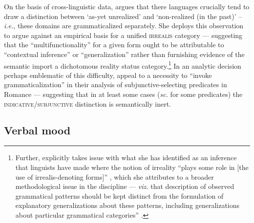 On the basis of cross-linguistic data, \citet[138\textit{ff}]{Cristofaro2012} argues that there languages crucially tend to draw a distinction between `as-yet unrealized' and `non-realized (in the past)' -- \textit{i.e.}, these domains are grammaticalized separately. She deploys this observation to argue against an empirical basis for a unified \textsc{irrealis} category --- suggesting that the ``multifunctionality'' for a given form ought to be attributable to ``contextual inference'' or ``generalization'' rather than furnishing evidence of the semantic import a dichotomous reality status category.\footnote{Further, \citeauthor{Cristofaro2012} explicitly takes issue with what she has identified as an inference that linguists have made where the notion of irreality ``plays some role in [the use of irrealis-denoting forms]'' \citeyearpar[132]{Cristofaro2012}, which she attributes to a broader methodological issue in the discipline --- \textit{viz.} that description of observed grammatical patterns should be kept distinct from the formulation of explanatory generalizations about these patterns, including generalizations about particular grammatical categories'' \citeyearpar[145]{Cristofaro2012}.}  In an analytic decision perhaps emblematic of this difficulty, \citet[467]{Portner2012} appeal to a necessity to ``invoke  grammaticalization'' in their analysis of subjunctive-selecting predicates in Romance --- suggesting that in at least some cases (\textit{sc.} for some predicates) the \textsc{indicative/subjunctive} distinction is semantically inert.
	
	
\subsection{Verbal mood}\label{sec:mood-lit}

